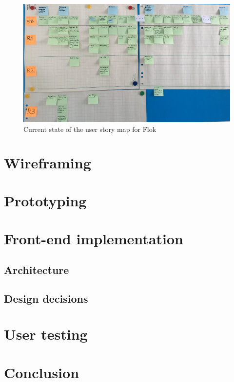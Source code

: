 \documentclass[a4paper,12pt, oneside]{article}
\begin{document}
\begin{figure}[!htb]
\centering
\includegraphics[width=\textwidth]{images/flokUsmCurrent.jpg}
\caption{Current state of the user story map for Flok}
\label{fig.flokUsmCurrent}
\end{figure}



\section{Wireframing}

\section{Prototyping}

\section{Front-end implementation}
\subsection{Architecture}

\subsection{Design decisions}

\section{User testing}

\section{Conclusion}

\clearpage


\end{document}
